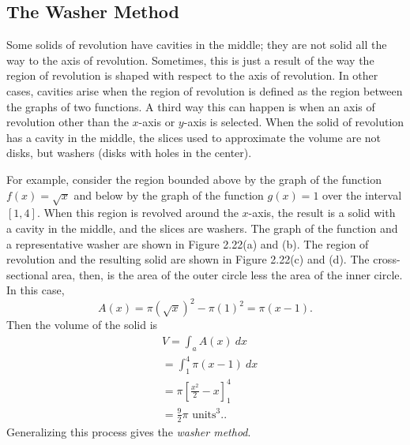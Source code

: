 \documentclass{report}
\begin{document}
    \subsection*{The Washer Method}
    \bigbreak \noindent 
    Some solids of revolution have cavities in the middle; they are not solid all the way to the axis of revolution. Sometimes, this is just a result of the way the region of revolution is shaped with respect to the axis of revolution. In other cases, cavities arise when the region of revolution is defined as the region between the graphs of two functions. A third way this can happen is when an axis of revolution other than the  $x$-axis or  $y$-axis is selected.
    \bigbreak \noindent 
    When the solid of revolution has a cavity in the middle, the slices used to approximate the volume are not disks, but washers (disks with holes in the center).
    \bigbreak \noindent 
    \begin{minipage}{0.47\textwidth}
        For example, consider the region bounded above by the graph of the function \( f(x) = \sqrt{x} \) and below by the graph of the function \( g(x) = 1 \) over the interval \([1, 4]\). When this region is revolved around the \( x \)-axis, the result is a solid with a cavity in the middle, and the slices are washers. The graph of the function and a representative washer are shown in Figure 2.22(a) and (b). The region of revolution and the resulting solid are shown in Figure 2.22(c) and (d).
        The cross-sectional area, then, is the area of the outer circle less the area of the inner circle. In this case,
        \[
        A(x) = \pi (\sqrt{x})^2 - \pi (1)^2 = \pi (x - 1).
        \]
        Then the volume of the solid is
        \begin{align*}
            &V = \int_{a}^{} A(x)\ dx \\
            &= \int_{1}^{4} \pi (x - 1)\ dx \\
            &= \pi \left[ \frac{x^2}{2} - x \right]_{1}^{4} \\
            &= \frac{9}{2} \pi \text{ units}^3. 
        .\end{align*}
        Generalizing this process gives the \textit{washer method}.
    \end{minipage}
\end{document}
